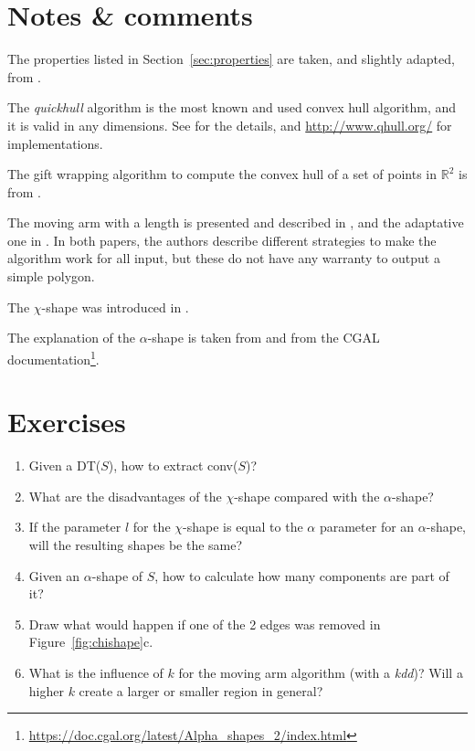 %
\section{Notes \& comments}

The properties listed in Section~\ref{sec:properties} are taken, and slightly adapted, from \citet{Galton06}. 

The \emph{quickhull} algorithm is the most known and used convex hull algorithm, and it is valid in any dimensions. See \citet{Barber96} for the details, and \url{http://www.qhull.org/} for implementations.

The gift wrapping algorithm to compute the convex hull of a set of points in $\mathbb{R}^2$ is from \citet{Jarvis73}.

The moving arm with a length is presented and described in \citet{Galton06}, and the adaptative one in \citet{Moreira07}.
In both papers, the authors describe different strategies to make the algorithm work for all input, but these do not have any warranty to output a simple polygon.

The $\chi$-shape was introduced in \citet{Duckham08}.

The explanation of the $\alpha$-shape is taken from \citet{Edelsbrunner94} and from the CGAL documentation\footnote{\url{https://doc.cgal.org/latest/Alpha_shapes_2/index.html}}.


%
\section{Exercises}

\begin{enumerate}
  \item Given a DT($S$), how to extract conv($S$)?
  \item What are the disadvantages of the $\chi$-shape compared with the $\alpha$-shape?
  \item If the parameter $l$ for the $\chi$-shape is equal to the $\alpha$ parameter for an $\alpha$-shape, will the resulting shapes be the same?
  \item Given an $\alpha$-shape of $S$, how to calculate how many components are part of it? 
  \item Draw what would happen if one of the 2 edges was removed in Figure~\ref{fig:chishape}c.
  \item What is the influence of $k$ for the moving arm algorithm (with a \emph{kdd})? Will a higher $k$ create a larger or smaller region in general?
\end{enumerate}



